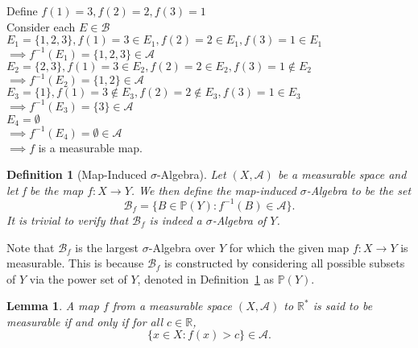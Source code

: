 \documentclass[10pt, oneside]{article}
\newcommand{\R}{\mathbb{R}}
\newtheorem{defn}{Definition}
\newtheorem{lem}{Lemma}
\begin{document}
Define $f(1)=3,f(2)=2,f(3)=1$\\
Consider each $E\in \mathcal{B}$ \\
$E_1=\{1,2,3\},f(1)=3\in E_1,f(2)=2\in E_1,f(3)=1\in E_1$\\ $\implies f^{-1}(E_1)=\{1,2,3\}\in \mathcal{A}$ \checkmark\\

$E_2=\{2,3\},f(1)=3\in E_2,f(2)=2\in E_2,f(3)=1\notin E_2$\\ $\implies f^{-1}(E_2)=\{1,2\}\in \mathcal{A}$ \checkmark\\

$E_3=\{1\},f(1)=3\notin E_3,f(2)=2\notin E_3, f(3)=1\in E_3$\\ $\implies f^{-1}(E_3)=\{3\}\in \mathcal{A}$ \checkmark\\

$E_4=\emptyset$\\ $\implies f^{-1}(E_4)=\emptyset\in \mathcal{A}$ \checkmark\\

$\implies f$ is a measurable map. 

\begin{defn}[Map-Induced $\sigma$-Algebra]
    \label{defn:map-ind-SA}
    Let $(X,\mathcal{A})$ be a measurable space and let f be the map $f \colon X 
    \to Y$. We then define the map-induced $\sigma$-Algebra to be the set 
    \[\mathcal{B}_f = \{B \in \mathbb{P}(Y) \colon f^{-1}(B) \in \mathcal{A}\}. \]
    It is trivial to verify that $\mathcal{B}_f$ is indeed a $\sigma$-Algebra of $Y$. 
\end{defn}

Note that $\mathcal{B}_f$ is the largest $\sigma$-Algebra over $Y$ for which the 
given map $f \colon X \to Y$ is measurable. This is because $\mathcal{B}_f$ is 
constructed by considering all possible subsets of $Y$ via the power set of $Y$, 
denoted in Definition~\ref{defn:map-ind-SA} as $\mathbb{P}(Y)$. 

\begin{lem}
    A map $f$ from a measurable space $(X,\mathcal{A})$ to $\R^{*}$ is said to be 
    measurable if and only if for all $c \in \R$, 
    \[\{x \in X \colon f(x) > c\} \in \mathcal{A}. \]
\end{lem}
\end{document}
